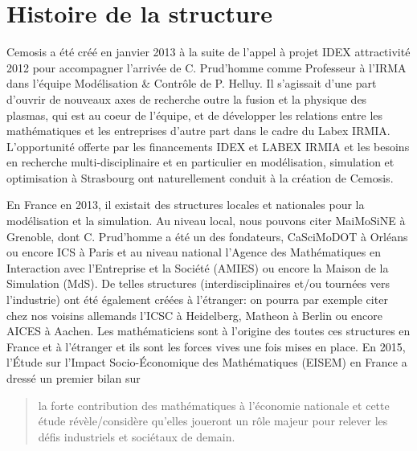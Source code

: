 \section*{Histoire de la structure}
	
Cemosis a été créé en janvier 2013 à la suite de l'appel à projet IDEX attractivité 2012 pour accompagner l'arrivée de C. Prud'homme comme Professeur à l'IRMA dans l'équipe Modélisation \& Contrôle de P. Helluy. Il s'agissait d'une part d'ouvrir de nouveaux axes de recherche outre la fusion et la physique des plasmas, qui est au coeur de l'équipe, et de développer les relations entre les mathématiques et les entreprises d'autre part dans le cadre du Labex IRMIA. L'opportunité offerte par les financements IDEX et LABEX IRMIA et les besoins en recherche multi-disciplinaire et en particulier en modélisation, simulation et optimisation  à Strasbourg ont naturellement conduit à la création de Cemosis.

En France en 2013, il existait des structures locales et nationales pour la modélisation et la simulation. Au niveau local, nous pouvons citer MaiMoSiNE à Grenoble, dont C. Prud'homme a été un des fondateurs, CaSciMoDOT à Orléans ou encore ICS à Paris et au niveau national l'Agence des Mathématiques en Interaction avec l'Entreprise et la Société (AMIES) ou encore la Maison de la Simulation  (MdS). De telles structures (interdisciplinaires et/ou tournées vers l'industrie) ont été également créées à l'étranger: on pourra par exemple citer chez nos voisins allemands l'ICSC à Heidelberg, Matheon à Berlin ou encore AICES à Aachen.
Les mathématiciens sont à l'origine des toutes ces structures en France et à l'étranger et ils sont les forces vives une fois mises en place. 
En 2015, l'Étude sur l'Impact Socio-Économique des Mathématiques (EISEM) en France a dressé un premier bilan sur 
\begin{quote}
la  forte contribution des mathématiques à l'économie nationale et cette étude révèle/considère qu'elles joueront un rôle majeur pour relever les défis industriels et sociétaux de demain.
\end{quote}

